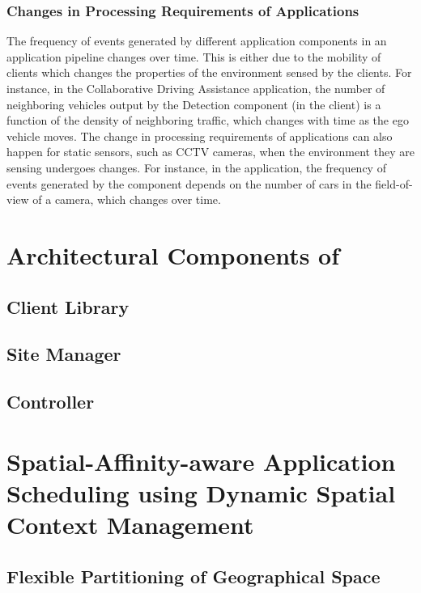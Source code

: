 \subsubsection{Changes in Processing Requirements of Applications}
The frequency of events generated by different application components in an application pipeline changes over time. This is either due to the mobility of clients which changes the properties of the environment sensed by the clients. For instance, in the Collaborative Driving Assistance application, the number of neighboring vehicles output by the Detection component (in the client) is a function of the density of neighboring traffic, which changes with time as the ego vehicle moves. The change in processing requirements of applications can also happen for static sensors, such as CCTV cameras, when the environment they are sensing undergoes changes. For instance, in the \todo{} application, the frequency of events generated by the \todo{} component depends on the number of cars in the field-of-view of a camera, which changes over time.

\section{Architectural Components of \oneedge{}}

\subsection{Client Library}

\subsection{Site Manager}

\subsection{Controller}

\section{Spatial-Affinity-aware Application Scheduling using Dynamic Spatial Context Management}

\subsection{Flexible Partitioning of Geographical Space}

